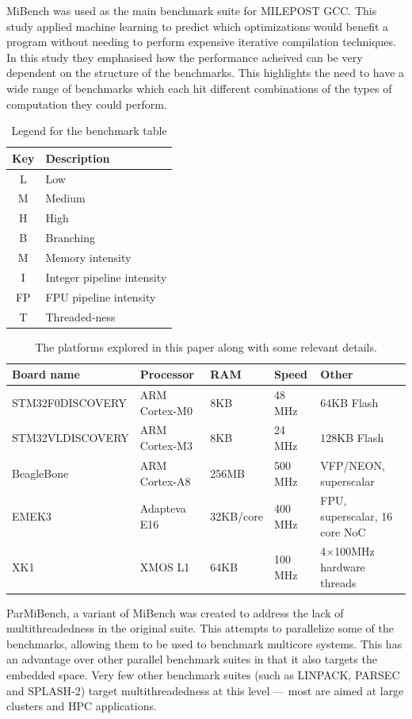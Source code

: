\documentclass[twocolumn]{article}
\begin{document}
MiBench was used as the main benchmark suite for MILEPOST GCC\cite{Fursin2011}. This study applied machine learning to predict which optimizations would benefit a program without needing to perform expensive iterative compilation techniques. In this study they emphasised how the performance acheived can be very dependent on the structure of the benchmarks. This highlights the need to have a wide range of benchmarks which each hit different combinations of the types of computation they could perform.

\begin{table}[t]
\centering
	\begin{tabular}{c l}
		Key & Description \\
		\hline
		L	&	Low \\
		M	&	Medium \\
		H	&	High \\
		\hline
		B	&	Branching \\
		M	&	Memory intensity \\
		I	&	Integer pipeline intensity \\
		FP	&	FPU pipeline intensity \\
		T	&	Threaded-ness \\
	\end{tabular}
	\caption{Legend for the benchmark table}
	\label{BenchmarkLegend}
\end{table}


\begin{table}[!hbt]
	\centering
	\begin{tabular}{l l l l l}
		\textbf{Board name} & \textbf{Processor} & \textbf{RAM} & \textbf{Speed} & \textbf{Other} \\
		\hline
		STM32F0DISCOVERY	& ARM Cortex-M0 		& 8KB		& 48 MHz		  & 64KB Flash\\
		STM32VLDISCOVERY	& ARM Cortex-M3 		& 8KB		& 24 MHz		  & 128KB Flash\\
		BeagleBone			& ARM Cortex-A8 		& 256MB		& 500 MHz		  & VFP/NEON, superscalar\\
		EMEK3				& Adapteva E16 			& 32KB/core & 400 MHz		  & FPU, superscalar, 16 core NoC\\
		XK1					& XMOS L1 				& 64KB		& 100 MHz 		& 4$\times$100MHz hardware threads \\
	\end{tabular}
	\caption{The platforms explored in this paper along with some relevant details.}
	\label{Table:Platforms}
\end{table}
ParMiBench, a variant of MiBench was created to address the lack of multithreadedness in the original suite. This attempts to parallelize some of the benchmarks, allowing them to be used to benchmark multicore systems. This has an advantage over other parallel benchmark suites in that it also targets the embedded space. Very few other benchmark suites (such as LINPACK, PARSEC and SPLASH-2\cite{Bienia2008}) target multithreadedness at this level --- most are aimed at large clusters and HPC applications.
\end{document}
